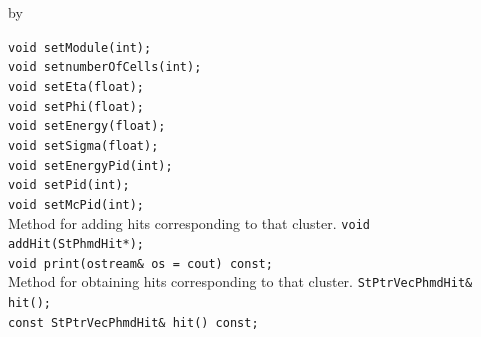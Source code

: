 \documentclass[twoside]{article}
\newcommand{\entrylabel}[1]{\mbox{\textbf{{#1}}}\hfil}%
\newenvironment{entry}
{\begin{list}{}%
    {\renewcommand{\makelabel}{\entrylabel}%
     \setlength{\labelwidth}{90pt}%
     \setlength{\leftmargin}{\labelwidth}
     \advance\leftmargin by \labelsep%
      }%
    }%
  {\end{list}}
\newcommand{\Entrylabel}[1]%
{\raisebox{0pt}[1ex][0pt]{\makebox[\labelwidth][l]%
    {\parbox[t]{\labelwidth}{\hspace{0pt}\textbf{{#1}}}}}}
\newenvironment{Entry}%
{\renewcommand{\entrylabel}{\Entrylabel}\begin{entry}}%
  {\end{entry}}
\begin{document}
\begin{Entry}
    \verb+void setModule(int);+\\
    \verb+void setnumberOfCells(int);+\\
    \verb+void setEta(float);+\\
    \verb+void setPhi(float);+\\
    \verb+void setEnergy(float);+\\
    \verb+void setSigma(float);+\\
    \verb+void setEnergyPid(int);+\\
    \verb+void setPid(int);+\\
    \verb+void setMcPid(int);+\\
  
  Method for adding hits corresponding to that cluster.
    \verb+void addHit(StPhmdHit*);+\\
    \verb+void print(ostream& os = cout) const;+\\

  Method for obtaining hits corresponding to that cluster.
    \verb+StPtrVecPhmdHit& hit();+\\
    \verb+const StPtrVecPhmdHit& hit() const;+\\

\end{Entry}
\clearpage
\end{document}

